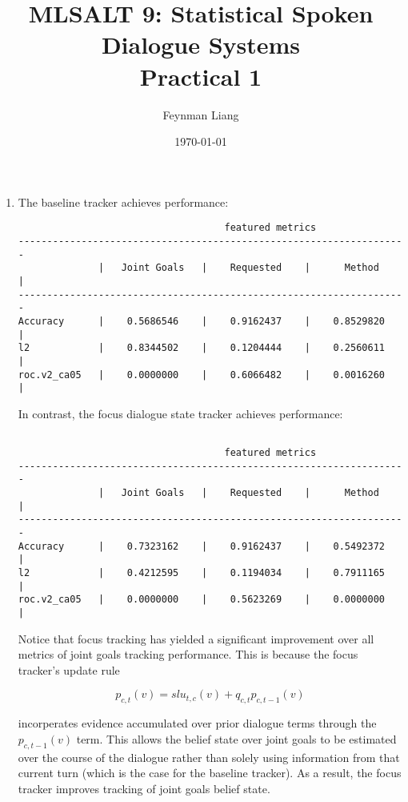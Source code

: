 \documentclass[a4paper,oneside,reqno]{amsart}
\newcommand{\authorname}{Feynman Liang}
\newcommand{\coursename}{MLSALT 9: Statistical Spoken Dialogue Systems}
\newcommand{\assignmentname}{Practical 1}
\begin{document}
%

\title{\coursename\\\assignmentname}

\author{\authorname}
\date{\today}

\maketitle

\begin{enumerate}
  \item The baseline tracker achieves performance:
\begin{verbatim}
                                    featured metrics
--------------------------------------------------------------------
              |   Joint Goals   |    Requested    |      Method    |
--------------------------------------------------------------------
Accuracy      |    0.5686546    |    0.9162437    |    0.8529820   |
l2            |    0.8344502    |    0.1204444    |    0.2560611   |
roc.v2_ca05   |    0.0000000    |    0.6066482    |    0.0016260   |
\end{verbatim}

In contrast, the focus dialogue state tracker achieves performance:
\begin{verbatim}

                                    featured metrics
--------------------------------------------------------------------
              |   Joint Goals   |    Requested    |      Method    |
--------------------------------------------------------------------
Accuracy      |    0.7323162    |    0.9162437    |    0.5492372   |
l2            |    0.4212595    |    0.1194034    |    0.7911165   |
roc.v2_ca05   |    0.0000000    |    0.5623269    |    0.0000000   |
\end{verbatim}

Notice that focus tracking has yielded a significant improvement over all
metrics of joint goals tracking performance. This is because the focus tracker's
update rule

\begin{equation}
	p_{c,t}(v) = slu_{t,c}(v) + q_{c,t} p_{c,t-1}(v)
\end{equation}

incorperates evidence accumulated over prior dialogue terms through the $p_{c,t-1}(v)$
term. This allows the belief state over joint goals to be estimated over the course
of the dialogue rather than solely using information from that current turn (which is
the case for the baseline tracker). As a result, the focus tracker improves tracking
of joint goals belief state.


\end{enumerate}
\end{document}
